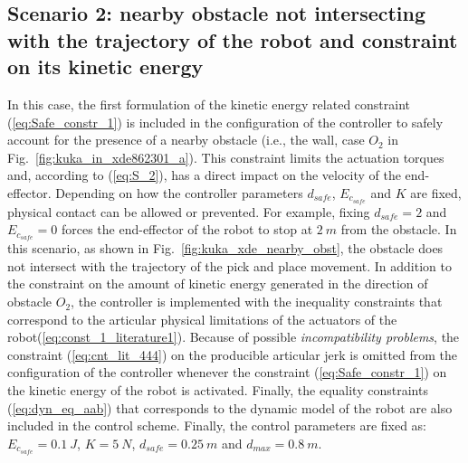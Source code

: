 \subsection{Scenario 2: nearby obstacle not intersecting with the trajectory of the robot and constraint on its kinetic energy} \label{subsec:no_inter_constr_Ec}
In this case, the first formulation of the kinetic energy related constraint (\ref{eq:Safe_constr_1}) is included in the configuration of the controller to safely account for the presence of a nearby obstacle (i.e., the wall, case $O_2$ in Fig.~\ref{fig:kuka_in_xde862301_a}). This constraint limits the actuation torques and, according to (\ref{eq:S_2}), has a direct impact on the velocity of the end-effector. Depending on how the controller parameters $d_{safe}$, $E_{c_{safe}}$ and $K$ are fixed, physical contact can be allowed or prevented. For example, fixing $d_{safe}=2$ and $E_{c_{safe}} = 0$ forces the end-effector of the robot to stop at $2~m$ from the obstacle. In this scenario, as shown in Fig.~\ref{fig:kuka_xde_nearby_obst}, the obstacle does not intersect with the trajectory of the pick and place movement. In addition to the constraint on the amount of kinetic energy generated in the direction of obstacle $O_2$, the controller is implemented with the inequality constraints that correspond to the articular physical limitations of the actuators of the robot(\ref{eq:const_1_literature1}). Because of possible \textit{incompatibility problems}, the constraint (\ref{eq:cnt_lit_444}) on the producible articular jerk is omitted from the configuration of the controller whenever the constraint (\ref{eq:Safe_constr_1}) on the kinetic energy of the robot is activated. Finally, the equality constraints (\ref{eq:dyn_eq_aab}) that corresponds to the dynamic model of the robot are also included in the control scheme. Finally, the control parameters are fixed as: $E_{c_{safe}} = 0.1~J$, $K = 5~N$, $d_{safe} = 0.25~m$ and $d_{max} = 0.8~m$.
%
%
